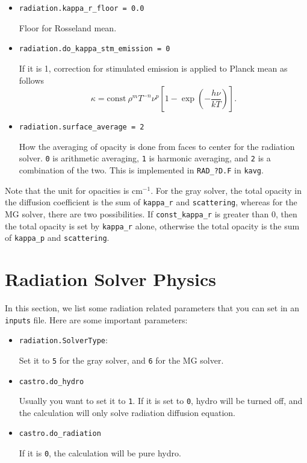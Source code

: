 \begin{itemize}
\item {\tt radiation.kappa\_r\_floor = 0.0}

  Floor for Rosseland mean.

\item{\tt radiation.do\_kappa\_stm\_emission = 0}

  If it is 1, correction for stimulated emission is applied to Planck mean as
  follows
  \begin{equation}
    \kappa = \mathrm{const}\ \rho^{m} T^{-n} \nu^{p}
    \left [1-\exp{\left (-\frac{h\nu}{k T} \right )} \right ].
  \end{equation}

\item {\tt radiation.surface\_average = 2}

 How the averaging of opacity is done from faces to center for
 the radiation solver.  {\tt 0} is arithmetic averaging, {\tt 1}
 is harmonic averaging, and {\tt 2} is a combination of the two.
 This is implemented in {\tt RAD\_?D.F} in {\tt kavg}.


\end{itemize}

\noindent Note that the unit for opacities is $\mathrm{cm}^{-1}$.  For
the gray solver, the total opacity in the diffusion coefficient is the sum
of {\tt kappa\_r} and {\tt scattering}, whereas for the MG solver,
there are two possibilities.  If {\tt const\_kappa\_r} is greater than
0, then the total opacity is set by {\tt kappa\_r} alone, otherwise
the total opacity is the sum of {\tt kappa\_p} and {\tt scattering}.


\section{Radiation Solver Physics}

In this section, we list some radiation related parameters that you
can set in an {\tt inputs} file.  Here are some important parameters:
\begin{itemize}
\item {\tt radiation.SolverType}:

  Set it to {\tt 5} for the gray solver, and {\tt 6} for the MG solver.

\item {\tt castro.do\_hydro}

  Usually you want to set it to {\tt 1}.  If it is set to {\tt 0},
  hydro will be turned off, and the calculation will only solve
  radiation diffusion equation.

\item {\tt castro.do\_radiation}

  If it is {\tt 0}, the calculation will be pure hydro.
\end{itemize}

